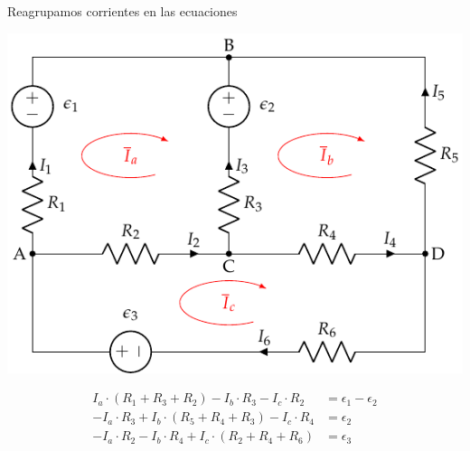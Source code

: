 \documentclass[xcolor={usenames,svgnames,dvipsnames}]{beamer}
\begin{document}
\begin{frame}[label={sec:org4773d21}]{Reagrupamos corrientes en las ecuaciones}
\begin{center}
\includegraphics[height=0.5\textheight]{figs/mallas1_corrientes.pdf}
\end{center}

\begin{align*}
  I_a \cdot (R_1 + R_3 + R_2)  - I_b\cdot R_3 - I_c \cdot R_2 &= \epsilon_1 - \epsilon_2\\
  - I_a \cdot R_3 + I_b \cdot (R_5 + R_4 + R_3) - I_c \cdot R_4 &=  \epsilon_2\\
  - I_a \cdot R_2 - I_b \cdot R_4 + I_c \cdot (R_2 + R_4 + R_6) &= \epsilon_3
\end{align*}
\end{frame}
\end{document}
